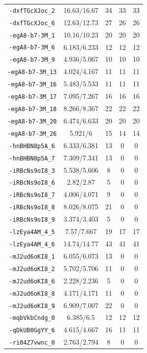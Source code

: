 \documentclass[bwprint]{gmcmthesis}
\begin{document}
\begin{longtable}{@{\extracolsep{\fill}}ccccc@{}}
\texttt{-dxfTGcXJoc\_2} & 16.63/16.67 & 34 & 33 & 33 \\
\texttt{-dxfTGcXJoc\_6} & 12.63/12.73 & 27 & 26 & 26 \\
\texttt{-egA8-b7-3M\_1} & 10.16/10.23 & 20 & 20 & 20 \\
\texttt{-egA8-b7-3M\_6} & 6.183/6.233 & 12 & 12 & 12 \\
\texttt{-egA8-b7-3M\_9} & 4.936/5.067 & 10 & 10 & 10 \\
\texttt{-egA8-b7-3M\_13} & 4.024/4.167 & 11 & 11 & 11 \\
\texttt{-egA8-b7-3M\_16} & 5.483/5.533 & 11 & 11 & 11 \\
\texttt{-egA8-b7-3M\_17} & 7.095/7.267 & 16 & 16 & 16 \\
\texttt{-egA8-b7-3M\_18} & 8.266/8.367 & 22 & 22 & 22 \\
\texttt{-egA8-b7-3M\_20} & 6.474/6.633 & 20 & 20 & 20 \\
\texttt{-egA8-b7-3M\_26} & 5.921/6 & 15 & 14 & 14 \\
\texttt{-hnBHBN8p5A\_6} & 6.333/6.381 & 13 & 0 & 0 \\
\texttt{-hnBHBN8p5A\_7} & 7.309/7.341 & 13 & 0 & 0 \\
\texttt{-iRBcNs9oI8\_3} & 5.538/5.606 & 8 & 0 & 0 \\
\texttt{-iRBcNs9oI8\_6} & 2.82/2.87 & 5 & 0 & 0 \\
\texttt{-iRBcNs9oI8\_7} & 4.006/4.071 & 9 & 0 & 0 \\
\texttt{-iRBcNs9oI8\_8} & 8.026/8.075 & 21 & 0 & 0 \\
\texttt{-iRBcNs9oI8\_9} & 3.374/3.403 & 5 & 0 & 0 \\
\texttt{-lzEya4AM\_4\_5} & 7.57/7.667 & 19 & 17 & 17 \\
\texttt{-lzEya4AM\_4\_6} & 14.74/14.77 & 43 & 41 & 41 \\
\texttt{-mJ2ud6oKI8\_1} & 6.055/6.073 & 13 & 0 & 0 \\
\texttt{-mJ2ud6oKI8\_2} & 5.702/5.706 & 11 & 0 & 0 \\
\texttt{-mJ2ud6oKI8\_6} & 2.228/2.236 & 5 & 0 & 0 \\
\texttt{-mJ2ud6oKI8\_8} & 4.171/4.171 & 11 & 0 & 0 \\
\texttt{-mJ2ud6oKI8\_9} & 6.909/7.007 & 22 & 0 & 0 \\
\texttt{-mqbVkbCndg\_0} & 6.385/6.5 & 12 & 12 & 12 \\
\texttt{-qDkUB0GgYY\_6} & 4.615/4.667 & 16 & 11 & 11 \\
\texttt{-ri04Z7vwnc\_0} & 2.763/2.794 & 8 & 0 & 0 \\

\end{longtable}
\end{document}
